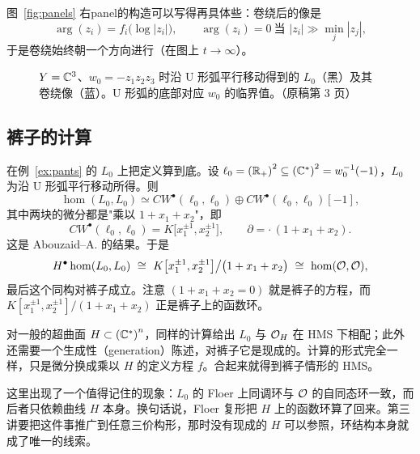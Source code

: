 图~\ref{fig:panels} 右panel的构造可以写得再具体些：卷绕后的像是
\[
\arg(z_i)=f_i\bigl(\log|z_i|\bigr),\qquad
\arg(z_i)=0\ \text{当 } |z_i|\gg\min_j|z_j|,
\]
于是卷绕始终朝一个方向进行（在图上 $t\to\infty$）。

\begin{figure}[htbp]
\centering
{}
\caption{$Y=\mathbb{C}^3$、$w_0=-z_1z_2z_3$ 时沿 U 形弧平行移动得到的 $L_0$（黑）及其卷绕像（蓝）。U 形弧的底部对应 $w_0$ 的临界值。（原稿第 3 页）}
\label{fig:uarc}
\end{figure}

\subsection{裤子的计算}

在例~\ref{ex:pants} 的 $L_0$ 上把定义算到底。设 $\ell_0=\left(\mathbb{R}_+\right)^2\subseteq\left(\mathbb{C}^*\right)^2=w_0^{-1}(-1)$，$L_0$ 为沿 U 形弧平行移动所得。则
\[
\hom(L_0,L_0)\simeq CW^\bullet(\ell_0,\ell_0)\oplus CW^\bullet(\ell_0,\ell_0)[-1],
\]
其中两块的微分都是"乘以 $1+x_1+x_2$"，即
\[
CW^\bullet(\ell_0,\ell_0)=K\bigl[x_1^{\pm1},x_2^{\pm1}\bigr],
\qquad \partial=\cdot\,(1+x_1+x_2).
\]
这是 Abouzaid--A. 的结果。于是
\[
H^\bullet\hom(L_0,L_0)\ \cong\ K\bigl[x_1^{\pm1},x_2^{\pm1}\bigr]\big/\bigl(1+x_1+x_2\bigr)
\ \cong\ \hom(\OO,\OO),
\]
最后这个同构对裤子成立。注意 $(1+x_1+x_2=0)$ 就是裤子的方程，而 $K[x_1^{\pm1},x_2^{\pm1}]/(1+x_1+x_2)$ 正是裤子上的函数环。

对一般的超曲面 $H\subset\left(\mathbb{C}^*\right)^n$，同样的计算给出 $L_0$ 与 $\mathcal{O}_H$ 在 HMS 下相配；此外还需要一个生成性（generation）陈述，对裤子它是现成的。计算的形式完全一样，只是微分换成乘以 $H$ 的定义方程 $f$。合起来就得到裤子情形的 HMS。

\begin{remark}
这里出现了一个值得记住的现象：$L_0$ 的 Floer 上同调环与 $\mathcal{O}$ 的自同态环一致，而后者只依赖曲线 $H$ 本身。换句话说，Floer 复形把 $H$ 上的函数环算了回来。第三讲要把这件事推广到任意三价构形，那时没有现成的 $H$ 可以参照，环结构本身就成了唯一的线索。
\end{remark}

